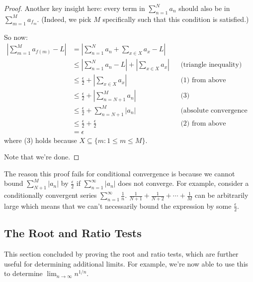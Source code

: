 \documentclass[answers,12pt]{exam}
\begin{document}
\begin{solution}
\begin{proof}
        Another key insight here:
        every term in $\sum_{n=1}^{N}a_n$ should also be in $\sum_{m=1}^{M} a_{f_m}$.
        (Indeed, we pick $M$ specifically such that this condition is satisfied.)

        So now:
        \begin{align*}
            \left | \sum_{m=1}^{M} a_{f(m)} - L \right | &= \left | \sum_{n=1}^{N} a_n + \sum_{x \in X} a_x - L \right | \\
            &\leq \left | \sum_{n=1}^{N} a_n -L \right | + \left | \sum_{x \in X} a_x \right | && \text{(triangle inequality)}\\
            &\leq \frac{\epsilon}{2} + \left | \sum_{x \in X} a_x \right | && \text{(1) from above} \\
            &\leq \frac{\epsilon}{2} + \left | \sum_{n=N+1}^{M} a_n \right | && \text{(3)}\\
            &\leq \frac{\epsilon}{2} + \sum_{n=N+1}^{M} \left | a_n \right | && \text{(absolute convergence test)}\\
            &\leq \frac{\epsilon}{2} + \frac{\epsilon}{2} && \text{(2) from above} \\
            &= \epsilon
        \end{align*}
        where (3) holds because $X \subseteq \{m: 1 \leq m \leq M \}$.

        Note that we're done.
    \end{proof}
    The reason this proof fails for conditional convergence is because we cannot bound $\sum_{N+1}^{M} |a_n|$ by $\frac{\epsilon}{2}$ if $\sum_{n=1}^{\infty} |a_n|$ does not converge.
    For example, consider a conditionally convergent series $\sum_{n=1}^{\infty} \frac{1}{n}$.
    $\frac{1}{N+1} + \frac{1}{N+2} + \cdots + \frac{1}{M}$ can be arbitrarily large which means that we can't necessarily bound the expression by some $\frac{\epsilon}{2}$.
\end{solution}

\subsection{The Root and Ratio Tests}
This section concluded by proving the root and ratio tests, which are further useful for determining additional limits.
For example, we're now able to use this to determine $\lim_{n \to \infty} n^{1/n}$.

\section{}
\end{document}
